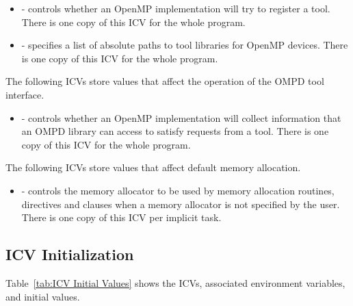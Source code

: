 \begin{itemize}
\item {} - controls whether an OpenMP implementation will try to register 
      a tool. There is one copy of this ICV for the whole program.
\item {} - specifies a list of absolute paths to tool libraries 
      for OpenMP devices. There is one copy of this ICV for the whole program.
\end{itemize}

The following ICVs store values that affect the operation of the OMPD tool interface.

\begin{itemize}
\item {} - controls whether an OpenMP implementation will collect
      information that an OMPD library can access to satisfy requests from
      a tool. There is one copy of this ICV for the whole program.
\end{itemize}

The following ICVs store values that affect default memory allocation.

\begin{itemize}
\item {} - controls the memory allocator to be used by 
      memory allocation routines, directives and clauses when a memory allocator 
      is not specified by the user. There is one copy of this ICV per implicit task.
\end{itemize}


\clearpage  %
\subsection{ICV Initialization}
\label{subsec:ICV Initialization}
Table~\ref{tab:ICV Initial Values} shows the ICVs, associated
environment variables, and initial values.

